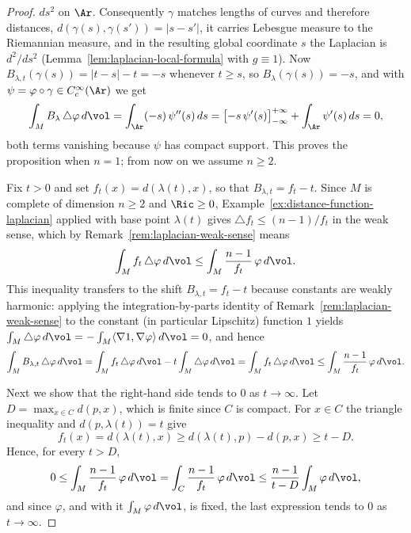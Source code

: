 \begin{proof}
$ds^2$ on $\Ar$. Consequently $\gamma$ matches lengths of curves
and therefore distances, $d(\gamma(s),\gamma(s'))=|s-s'|$, it
carries Lebesgue measure to the Riemannian measure, and in the
resulting global coordinate $s$ the Laplacian is $d^2/ds^2$
(Lemma~\ref{lem:laplacian-local-formula} with $g\equiv1$). Now
$B_{\lambda,t}(\gamma(s))=|t-s|-t=-s$ whenever $t\ge s$, so
$B_\lambda(\gamma(s))=-s$, and with
$\psi=\varphi\circ\gamma\in C^\infty_c(\Ar)$ we get
$$\int_MB_\lambda\,\triangle\varphi\,d\vol
=\int_{\Ar}(-s)\,\psi''(s)\,ds
=\bigl[-s\,\psi'(s)\bigr]_{-\infty}^{+\infty}
+\int_{\Ar}\psi'(s)\,ds=0,$$
both terms vanishing because $\psi$ has compact support. This
proves the proposition when $n=1$; from now on we assume $n\ge2$.

Fix $t>0$ and set $f_t(x)=d(\lambda(t),x)$, so that
$B_{\lambda,t}=f_t-t$. Since $M$ is complete of dimension $n\ge2$
and $\Ric\ge0$, Example~\ref{ex:distance-function-laplacian}
applied with base point $\lambda(t)$ gives $\triangle
f_t\le(n-1)/f_t$ in the weak sense, which by
Remark~\ref{rem:laplacian-weak-sense} means
$$\int_Mf_t\,\triangle\varphi\,d\vol
\le\int_M\frac{n-1}{f_t}\,\varphi\,d\vol.$$
This inequality transfers to the shift $B_{\lambda,t}=f_t-t$
because constants are weakly harmonic: applying the
integration-by-parts identity of
Remark~\ref{rem:laplacian-weak-sense} to the constant (in
particular Lipschitz) function $1$ yields
$\int_M\triangle\varphi\,d\vol
=-\int_M\langle\nabla1,\nabla\varphi\rangle\,d\vol=0$, and hence
$$\int_MB_{\lambda,t}\,\triangle\varphi\,d\vol
=\int_Mf_t\,\triangle\varphi\,d\vol
-t\int_M\triangle\varphi\,d\vol
=\int_Mf_t\,\triangle\varphi\,d\vol
\le\int_M\frac{n-1}{f_t}\,\varphi\,d\vol.$$

Next we show that the right-hand side tends to $0$ as
$t\to\infty$. Let $D=\max_{x\in C}d(p,x)$, which is finite since
$C$ is compact. For $x\in C$ the triangle inequality and
$d(p,\lambda(t))=t$ give
$$f_t(x)=d(\lambda(t),x)\ge d(\lambda(t),p)-d(p,x)\ge t-D.$$
Hence, for every $t>D$,
$$0\le\int_M\frac{n-1}{f_t}\,\varphi\,d\vol
=\int_C\frac{n-1}{f_t}\,\varphi\,d\vol
\le\frac{n-1}{t-D}\int_M\varphi\,d\vol,$$
and since $\varphi$, and with it $\int_M\varphi\,d\vol$, is fixed,
the last expression tends to $0$ as $t\to\infty$.


\end{proof}
